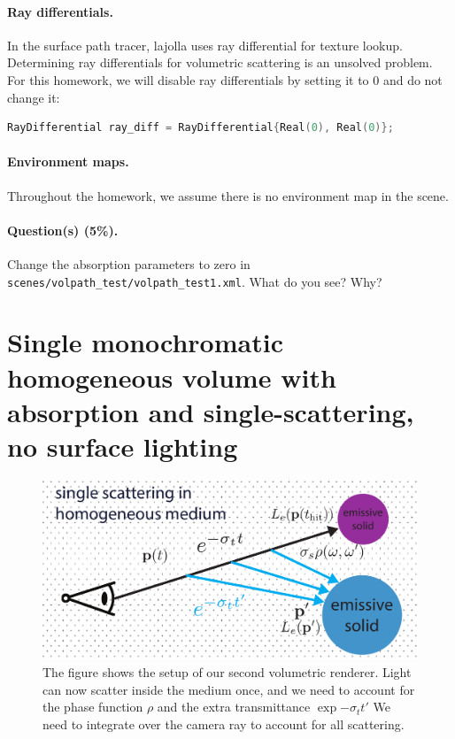 \paragraph{Ray differentials.} In the surface path tracer, lajolla uses ray differential for texture lookup. Determining ray differentials for volumetric scattering is an unsolved problem. For this homework, we will disable ray differentials by setting it to 0 and do not change it:
\begin{lstlisting}[language=c++]
RayDifferential ray_diff = RayDifferential{Real(0), Real(0)};
\end{lstlisting}

\paragraph{Environment maps.} Throughout the homework, we assume there is no environment map in the scene. 

\paragraph{Question(s) (5\%).} Change the absorption parameters to zero in \lstinline{scenes/volpath_test/volpath_test1.xml}. What do you see? Why?

\section{Single monochromatic homogeneous volume with absorption and single-scattering, no surface lighting}
\begin{figure}
\includegraphics[width=\linewidth]{imgs/single_scattering.pdf}
\caption{The figure shows the setup of our second volumetric renderer. Light can now scatter inside the medium once, and we need to account for the phase function $\rho$ and the extra transmittance $\exp{-\sigma_t t'}$ We need to integrate over the camera ray to account for all scattering.}
\label{fig:volpath2_illustration}
\end{figure}

